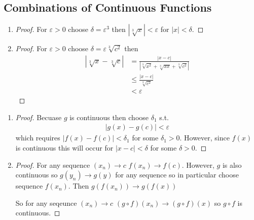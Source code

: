 \subsection{Combinations of Continuous Functions}

\begin{enumerate}[label=(\alph*)]
    \item 
    \begin{proof}
        For $\varepsilon>0$ choose
        $\delta = \varepsilon^3$ then $|\sqrt[3]{x}| < \varepsilon$
        for $|x| < \delta$.
    \end{proof}

     \item 
    \begin{proof}
        For $\varepsilon>0$ choose $\delta=\varepsilon\sqrt[3]{c^2}$
        then
        \begin{align*}
            |\sqrt[3]{x} - \sqrt[3]{c}| &= \frac{|x-c|}{|\sqrt[3]{x^2} + \sqrt[3]{xx} +\sqrt[3]{c^2}|} \\
            &\leq \frac{|x-c|}{\sqrt[3]{c^2}} \\
            &< \varepsilon
        \end{align*}
    \end{proof}
\end{enumerate}

\begin{enumerate}[label=(\alph*)]
    \item 
    \begin{proof}
        Becuase $g$ is continuous then choose $\delta_1$ s.t. 
        \begin{align*}
            |g(x)-g(c)|<\varepsilon
        \end{align*}
        which requires $|f(x)-f(c)|<\delta_1$ for some $\delta_1>0$.
        However, since $f(x)$ is continuous this will occur for $|x-c|<\delta$
        for some $\delta>0$.
    \end{proof}

    \item
    \begin{proof}
        For any sequence $(x_n)\rightarrow c$ $f(x_n)\rightarrow f(c)$.
        However, $g$ is also continuous so $g(y_n)\rightarrow g(y)$
        for any sequence so in particular choose sequence $f(x_n)$. Then 
        $g(f(x_n))\rightarrow g(f(x))$
        
        So for any seqeunce $(x_n)\rightarrow c$ $(g\circ f)(x_n) \rightarrow (g\circ f)(x)$
        so $g\circ f$ is continuous.
    \end{proof}
\end{enumerate}

